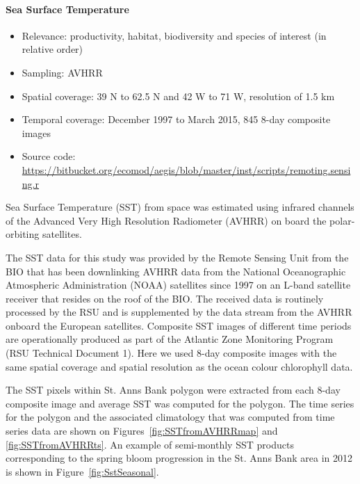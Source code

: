 \documentclass[letterpaper,portrait,11pt]{scrartcl}
\numberwithin{equation}{section}    %
\numberwithin{figure}{section}    %
\numberwithin{table}{section}       %
\begin{document}
\afterpage{\clearpage}
\paragraph{Sea Surface Temperature}

\begin{itemize}
  \item Relevance:  productivity, habitat, biodiversity and species of interest (in relative order)
  \item Sampling:  AVHRR
  \item Spatial coverage: 39 N to 62.5 N and 42 W to 71 W, resolution of 1.5 km
  \item Temporal coverage: December 1997 to March 2015, 845 8-day composite images
  \item Source code: \url{https://bitbucket.org/ecomod/aegis/blob/master/inst/scripts/remoting.sensing.r}
\end{itemize}

Sea Surface Temperature (SST) from space was estimated using infrared channels of the Advanced Very High Resolution Radiometer (AVHRR) on board the polar-orbiting satellites.

The SST data for this study was provided by the Remote Sensing Unit from the BIO that has been downlinking AVHRR data from the National Oceanographic Atmospheric Administration (NOAA) satellites since 1997 on an L-band satellite receiver that resides on the roof of the BIO. The received data is routinely processed by the RSU and is supplemented by the data stream from the AVHRR onboard the European satellites. Composite SST images of different time periods are operationally produced as part of the Atlantic Zone Monitoring Program (RSU Technical Document 1). Here we used 8-day composite images with the same spatial coverage and spatial resolution as the ocean colour chlorophyll data.

The SST pixels within St. Anns Bank polygon were extracted from each 8-day composite image and average SST was computed for the polygon. The time series for the polygon and the associated climatology that was computed from time series data are shown on Figures~\ref{fig:SSTfromAVHRRmap} and \ref{fig:SSTfromAVHRRts}. An example of semi-monthly SST products corresponding to the spring bloom progression in the St. Anns Bank area in 2012 is shown in Figure~\ref{fig:SstSeasonal}.
\end{document}

